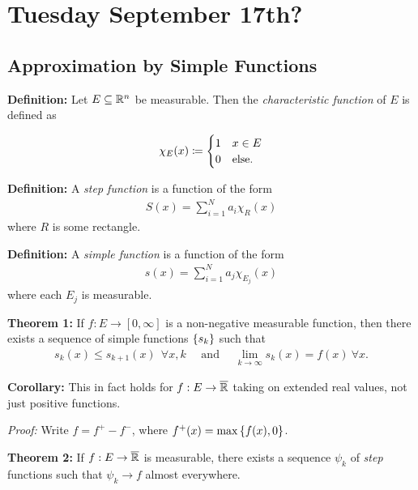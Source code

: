 \hypertarget{tuesday-september-17th}{%
\section{Tuesday September 17th?}\label{tuesday-september-17th}}

\hypertarget{approximation-by-simple-functions}{%
\subsection{Approximation by Simple
Functions}\label{approximation-by-simple-functions}}

\textbf{Definition:} Let \(E \subseteq {\mathbb{R}}^n\) be measurable. Then the
\emph{characteristic function} of \(E\) is defined as

\begin{align*}
\chi_E(x) \coloneqq 
\begin{cases} 
1 & x \in E \\ 
0 & \text{else.} 
\end{cases}
\end{align*}

\textbf{Definition:} A \emph{step function} is a function of the form
\begin{align*}
S(x) = \sum_{i=1}^N a_i \chi_R(x)
\end{align*} where \(R\) is some rectangle.

\textbf{Definition:} A \emph{simple function} is a function of the form
\begin{align*}
s(x) = \sum_{i=1}^N a_j \chi_{E_j}(x)
\end{align*} where each \(E_j\) is measurable.

\textbf{Theorem 1:} If \(f: E \to [0, \infty]\) is a non-negative
measurable function, then there exists a sequence of simple functions
\(\left\{{s_k}\right\}\) such that
\begin{align*}
s_k(x) \leq s_{k+1}(x) ~~\forall x, k \quad \text{ and } \quad 
\lim_{k\to\infty} s_k(x) = f(x) ~\forall x
.\end{align*}

\textbf{Corollary:} This in fact holds for \(f: E \to \overline {{\mathbb{R}}}\)
taking on extended real values, not just positive functions.

\emph{Proof:} Write \(f = f^+ - f^-\), where
\(f^+(x) = \max\left\{{f(x), 0}\right\}\).

\textbf{Theorem 2:} If \(f: E \to \overline {{\mathbb{R}}}\) is measurable, there
exists a sequence \(\psi_k\) of \emph{step} functions such that
\(\psi_k \to f\) almost everywhere.


